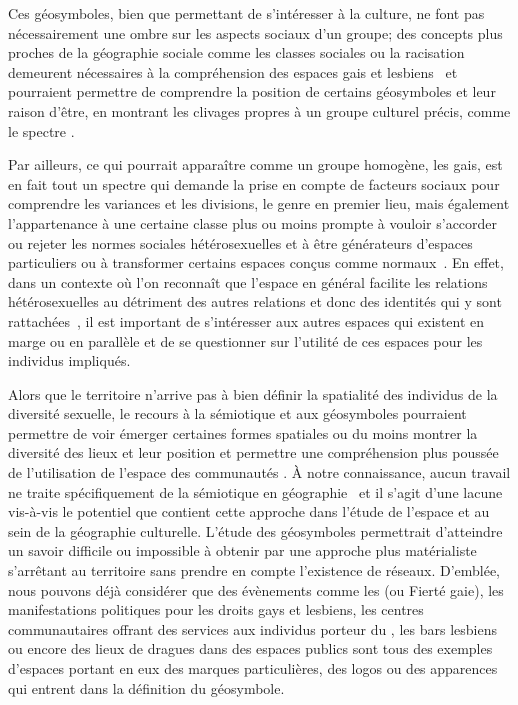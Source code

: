 Ces géosymboles, bien que permettant de s'intéresser à la culture, ne font pas nécessairement une ombre sur les aspects sociaux d'un groupe; des concepts plus proches de la géographie sociale comme les classes sociales ou la racisation~\citep{Bonniol2005} demeurent nécessaires à la compréhension des espaces gais et lesbiens~\citep[93]{Oswin2008} et pourraient permettre de comprendre la position de certains géosymboles et leur raison d'être, en montrant les clivages propres à un groupe culturel précis, comme le spectre \lgbt{}.

Par ailleurs, ce qui pourrait apparaître comme un groupe homogène, les gais, est en fait tout un spectre qui demande la prise en compte de facteurs sociaux pour comprendre les variances et les divisions, le genre en premier lieu, mais également l'appartenance à une certaine classe plus ou moins prompte à vouloir s'accorder ou rejeter les normes sociales hétérosexuelles et à être générateurs d'espaces particuliers ou à transformer certains espaces conçus comme normaux~\citep{Lewis2011}. 
En effet, dans un contexte où l'on reconnaît que l'espace en général facilite les relations hétérosexuelles au détriment des autres relations et donc des identités qui y sont rattachées~\citep{Brown2003}, il est important de s'intéresser aux autres espaces qui existent en marge ou en parallèle et de se questionner sur l'utilité de ces espaces pour les individus impliqués.

Alors que le territoire n'arrive pas à bien définir la spatialité des individus de la diversité sexuelle, le recours à la sémiotique et aux géosymboles pourraient permettre de voir émerger certaines formes spatiales ou du moins montrer la diversité des lieux et leur position et permettre une compréhension plus poussée de l'utilisation de l'espace des communautés \lgbt{}. 
À notre connaissance, aucun travail ne traite spécifiquement de la sémiotique en géographie \qu\ et il s'agit d'une lacune vis-à-vis le potentiel que contient cette approche dans l'étude de l'espace et au sein de la géographie culturelle.
L'étude des géosymboles permettrait d'atteindre un savoir difficile ou impossible à obtenir par une approche plus matérialiste s'arrêtant au territoire sans prendre en compte l'existence de réseaux. 
D'emblée, nous pouvons déjà considérer que des évènements comme les  (ou Fierté gaie), les manifestations politiques pour les droits gays et lesbiens, les centres communautaires offrant des services aux individus porteur du \vih, les bars lesbiens ou encore des lieux de dragues dans des espaces publics sont tous des exemples d'espaces \lgbt{} portant en eux des marques particulières, des logos ou des apparences qui entrent dans la définition du géosymbole.

